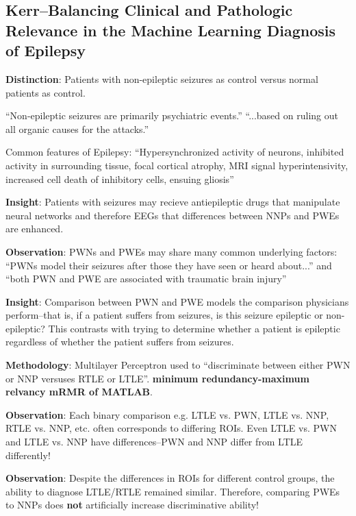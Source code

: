 \documentclass{article}
\begin{document}
{    \subsection{Kerr--Balancing Clinical and Pathologic Relevance in the Machine 
Learning
    Diagnosis of Epilepsy}
        \textbf{Distinction}: Patients with non-epileptic seizures as control 
versus
        normal patients as control.

        ``Non-epileptic seizures are primarily psychiatric events.'' ``...based 
on
        ruling out all organic causes for the attacks.''


        Common features of Epilepsy: ``Hypersynchronized activity of neurons, 
inhibited
        activity in surrounding tissue, focal cortical atrophy, MRI signal
        hyperintensivity, increased cell death of inhibitory cells, ensuing 
gliosis''

        \textbf{Insight}: Patients with seizures may recieve antiepileptic drugs 
that manipulate
        neural networks and therefore EEGs that differences between NNPs and 
PWEs are
        enhanced.

        \textbf{Observation}: PWNs and PWEs may share many common underlying 
factors: ``PWNs
        model their seizures after those they have seen or heard about...'' and 
``both
        PWN and PWE are associated with traumatic brain injury''

        \textbf{Insight}: Comparison between PWN and PWE models the comparison 
physicians
        perform--that is, if a patient suffers from seizures, is this seizure 
epileptic
        or non-epileptic? This contrasts with trying to determine whether a 
patient is
        epileptic regardless of whether the patient suffers from seizures.

        \textbf{Methodology}: Multilayer Perceptron used to ``discriminate 
between either PWN or
        NNP versuses RTLE or LTLE''. \textbf{minimum redundancy-maximum relvancy 
mRMR of
        MATLAB}.

        \textbf{Observation}: Each binary comparison e.g. LTLE vs. PWN, LTLE vs. 
NNP, RTLE vs.
        NNP, etc. often corresponds to differing ROIs. Even LTLE vs. PWN and 
LTLE vs.
        NNP have differences--PWN and NNP differ from LTLE differently!

        \textbf{Observation}: Despite the differences in ROIs for different 
control
        groups, the ability to diagnose LTLE/RTLE remained similar. Therefore,
        comparing PWEs to NNPs does \textbf{not} artificially increase 
discriminative
        ability!

}
\end{document}
